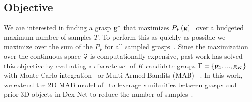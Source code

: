 \subsection{Objective}
We are interested in finding a grasp $\mathbf{g}^*$ that maximizes $P_F(\mathbf{g})$~\cite{kim2012physically, laskey2015bandits, mahler2015gp, weisz2012pose} over a budgeted maximum number of samples $T$.
To perform this as quickly as possible we maximize over the sum of the $P_F$ for all sampled grasps~\cite{laskey2015bandits, srinivas10gaussian}.
Since the maximization over the continuous space $\mathcal{G}$ is computationally expensive, past work has solved this objective by evaluating a discrete set of $K$ candidate grasps $\Gamma = \left\{ \mathbf{g}_1, ..., \mathbf{g}_K \right\}$ with Monte-Carlo integration~\cite{kehoe2012toward, weisz2012pose} or Multi-Armed Bandits (MAB) ~\cite{laskey2015bandits}.
In this work, we extend the 2D MAB model of~\cite{laskey2015bandits} to leverage similarities between grasps and prior 3D objects in Dex-Net to reduce the number of samples~\cite{hoffman2013exploiting, pandey2007multi}.